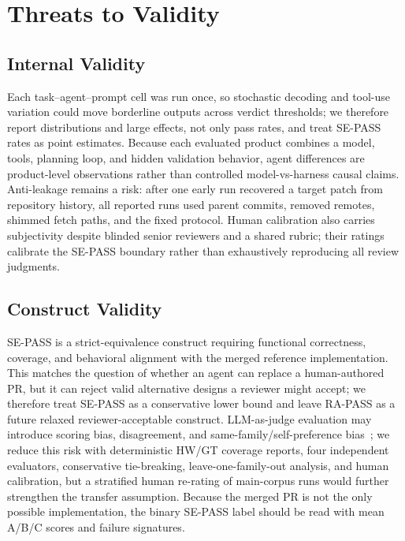 \section{Threats to Validity}
\label{sec:threats}

\subsection{Internal Validity}

Each task--agent--prompt cell was run once, so stochastic decoding and tool-use variation could move borderline outputs across verdict thresholds; we therefore report distributions and large effects, not only pass rates, and treat SE-PASS rates as point estimates. Because each evaluated product combines a model, tools, planning loop, and hidden validation behavior, agent differences are product-level observations rather than controlled model-vs-harness causal claims. Anti-leakage remains a risk: after one early run recovered a target patch from repository history, all reported runs used parent commits, removed remotes, shimmed fetch paths, and the fixed protocol. Human calibration also carries subjectivity despite blinded senior reviewers and a shared rubric; their ratings calibrate the SE-PASS boundary rather than exhaustively reproducing all review judgments.

\subsection{Construct Validity}

SE-PASS is a strict-equivalence construct requiring functional correctness, coverage, and behavioral alignment with the merged reference implementation. This matches the question of whether an agent can replace a human-authored PR, but it can reject valid alternative designs a reviewer might accept; we therefore treat SE-PASS as a conservative lower bound and leave RA-PASS as a future relaxed reviewer-acceptable construct. LLM-as-judge evaluation may introduce scoring bias, disagreement, and same-family/self-preference bias~\cite{wataoka2024selfpreference}; we reduce this risk with deterministic HW/GT coverage reports, four independent evaluators, conservative tie-breaking, leave-one-family-out analysis, and human calibration, but a stratified human re-rating of main-corpus runs would further strengthen the transfer assumption. Because the merged PR is not the only possible implementation, the binary SE-PASS label should be read with mean A/B/C scores and failure signatures.

